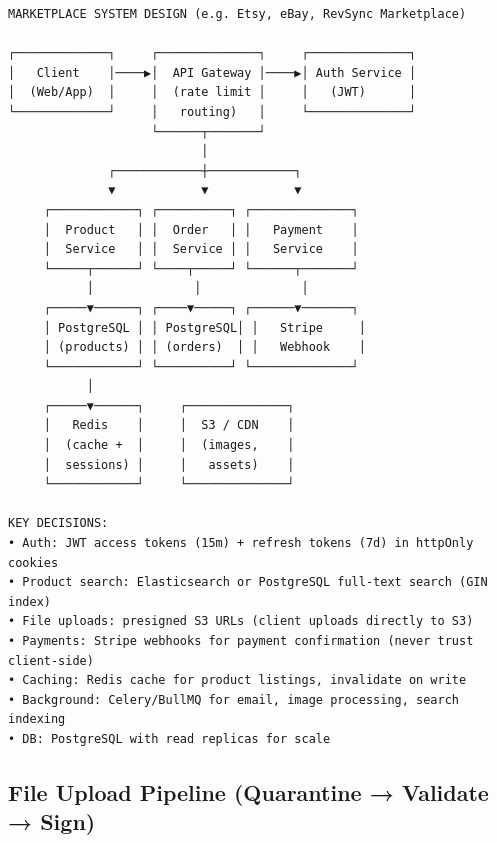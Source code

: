 \documentclass[10pt, a4paper]{article}
\begin{document}
\begin{lstlisting}
MARKETPLACE SYSTEM DESIGN (e.g. Etsy, eBay, RevSync Marketplace)

┌─────────────┐     ┌──────────────┐     ┌──────────────┐
│   Client    │────▶│  API Gateway │────▶│ Auth Service │
│  (Web/App)  │     │  (rate limit │     │   (JWT)      │
└─────────────┘     │   routing)   │     └──────────────┘
                    └──────┬───────┘
                           │
              ┌────────────┼────────────┐
              ▼            ▼            ▼
     ┌────────────┐ ┌──────────┐ ┌──────────────┐
     │  Product   │ │  Order   │ │   Payment    │
     │  Service   │ │  Service │ │   Service    │
     └─────┬──────┘ └────┬─────┘ └──────┬───────┘
           │              │              │
     ┌─────▼──────┐ ┌────▼─────┐ ┌──────▼───────┐
     │ PostgreSQL │ │ PostgreSQL│ │   Stripe     │
     │ (products) │ │ (orders)  │ │   Webhook    │
     └────────────┘ └──────────┘ └──────────────┘
           │
     ┌─────▼──────┐     ┌──────────────┐
     │   Redis    │     │  S3 / CDN    │
     │  (cache +  │     │  (images,    │
     │  sessions) │     │   assets)    │
     └────────────┘     └──────────────┘

KEY DECISIONS:
• Auth: JWT access tokens (15m) + refresh tokens (7d) in httpOnly cookies
• Product search: Elasticsearch or PostgreSQL full-text search (GIN index)
• File uploads: presigned S3 URLs (client uploads directly to S3)
• Payments: Stripe webhooks for payment confirmation (never trust client-side)
• Caching: Redis cache for product listings, invalidate on write
• Background: Celery/BullMQ for email, image processing, search indexing
• DB: PostgreSQL with read replicas for scale
\end{lstlisting}


\subsection{File Upload Pipeline (Quarantine → Validate → Sign)}
\end{document}
